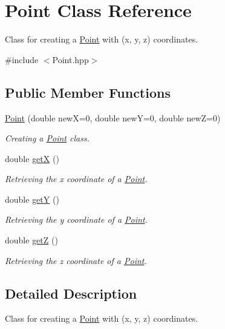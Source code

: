 \hypertarget{classPoint}{}\section{Point Class Reference}
\label{classPoint}


Class for creating a \hyperlink{classPoint}{Point} with (x, y, z) coordinates.  




{\ttfamily \#include $<$Point.\+hpp$>$}

\subsection*{Public Member Functions}
\begin{DoxyCompactItemize}
\item 
\hyperlink{classPoint_a3bf3cbefaab4bfb7843c0b803c4e7466}{Point} (double newX=0, double newY=0, double newZ=0)
\begin{DoxyCompactList}\small\item\em Creating a \hyperlink{classPoint}{Point} class. \end{DoxyCompactList}\item 
double \hyperlink{classPoint_a8de35a6098cdd7267b4167776da83da6}{getX} ()
\begin{DoxyCompactList}\small\item\em Retrieving the x coordinate of a \hyperlink{classPoint}{Point}. \end{DoxyCompactList}\item 
double \hyperlink{classPoint_aa278c8bcb8aeb4101023a4baf473b547}{getY} ()
\begin{DoxyCompactList}\small\item\em Retrieving the y coordinate of a \hyperlink{classPoint}{Point}. \end{DoxyCompactList}\item 
double \hyperlink{classPoint_a7c43742b167f182e08cc1b9aac9661e9}{getZ} ()
\begin{DoxyCompactList}\small\item\em Retrieving the z coordinate of a \hyperlink{classPoint}{Point}. \end{DoxyCompactList}\end{DoxyCompactItemize}


\subsection{Detailed Description}
Class for creating a \hyperlink{classPoint}{Point} with (x, y, z) coordinates. 

